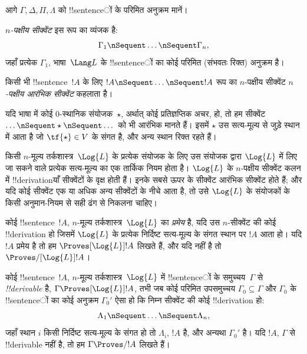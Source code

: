 \documentclass[../../../include/open-logic-section]{subfiles}
\begin{document}


आगे $\Gamma, \Delta, \Pi, \Lambda$ को !!{sentence}ों के परिमित अनुक्रम मानें।

\begin{defn}[सीक्वेंट]
\emph{$n$-पक्षीय सीक्वेंट} इस रूप का व्यंजक है:
\[
\Gamma_1 \nSequent \dots \nSequent \Gamma_n,
\]
जहाँ प्रत्येक $\Gamma_1$, भाषा~$\Lang L$ के !!{sentence}ों का कोई परिमित
(संभवतः रिक्त) अनुक्रम है।
\end{defn}

\begin{defn}[आरंभिक सीक्वेंट]
किसी भी !!{sentence}~$!A$ के लिए $!A \nSequent \dots \nSequent !A$ रूप का
$n$-पक्षीय सीक्वेंट \emph{$n$-पक्षीय आरंभिक सीक्वेंट} कहलाता है।

यदि भाषा में कोई $0$-स्थानिक संयोजक~$\star$, अर्थात् कोई प्रतिज्ञप्तिक
अचर, हो, तो हम सीक्वेंट $\dots \nSequent \star \nSequent \dots$ को भी
आरंभिक मानते हैं। इसमें $\star$ उस सत्य-मूल्य से जुड़े स्थान में आता है जो
$\tf{\star} \in V$ के संगत है, और अन्य स्थान रिक्त रहते हैं।
\end{defn}

किसी $n$-मूल्य तर्कशास्त्र~$\Log{L}$ के प्रत्येक संयोजक के लिए उस संयोजक
द्वारा $\Log{L}$ में लिए जा सकने वाले प्रत्येक सत्य-मूल्य का एक तार्किक
नियम होता है। $\Log{L}$ के $n$-पक्षीय सीक्वेंट कलन में !!{derivation}याँ
सीक्वेंटों के वृक्ष होती हैं। इनके सबसे ऊपर के सीक्वेंट आरंभिक सीक्वेंट होते
हैं; और यदि कोई सीक्वेंट एक या अधिक अन्य सीक्वेंटों के नीचे आता है, तो उसे
$\Log{L}$ के संयोजकों के किसी अनुमान-नियम से सही ढंग से निकलना चाहिए।

\begin{defn}[प्रमेय]
कोई !!{sentence}~$!A$, $n$-मूल्य तर्कशास्त्र~$\Log{L}$ का \emph{प्रमेय} है,
यदि उस $n$-सीक्वेंट की कोई !!{derivation} हो जिसमें $\Log{L}$ के प्रत्येक
निर्दिष्ट सत्य-मूल्य के संगत स्थान पर $!A$ आता हो। यदि $!A$ प्रमेय है तो हम
$\Proves[\Log{L}] !A$ लिखते हैं, और यदि नहीं है तो
$\Proves/[\Log{L}] !A$।
\end{defn}

\begin{defn}[!!^{derivability}]
कोई !!{sentence}~$!A$, $n$-मूल्य तर्कशास्त्र~$\Log{L}$ में !!{sentence}ों के
समुच्चय~$\Gamma$ से \emph{!!{derivable}} है,
$\Gamma \Proves[\Log{L}] !A$, तभी जब कोई परिमित उपसमुच्चय
$\Gamma_0 \subseteq \Gamma$ और $\Gamma_0$ के !!{sentence}ों का कोई अनुक्रम
$\Gamma_0'$ ऐसा हो कि निम्न सीक्वेंट की कोई !!{derivation} हो:
\[
\Lambda_1 \nSequent \dots \nSequent \Lambda_n,
\]
जहाँ स्थान $i$ किसी निर्दिष्ट सत्य-मूल्य के संगत हो तो $\Lambda_i$, $!A$
है, और अन्यथा $\Gamma_0'$ है। यदि $!A$, $\Gamma$ से !!{derivable} नहीं
है, तो हम $\Gamma \Proves/ !A$ लिखते हैं।
\end{defn}
\end{document}
